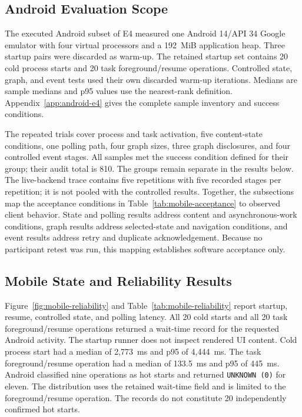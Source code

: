 \subsection{Android Evaluation Scope}
\label{sec:e4-android}

The executed Android subset of E4 measured one Android 14/API 34 Google emulator with four virtual processors and a 192~MiB application heap.
Three startup pairs were discarded as warm-up.
The retained startup set contains 20 cold process starts and 20 task foreground/resume operations.
Controlled state, graph, and event tests used their own discarded warm-up iterations.
Medians are sample medians and p95 values use the nearest-rank definition.
Appendix~\ref{app:android-e4} gives the complete sample inventory and success conditions.

The repeated trials cover process and task activation, five content-state conditions, one polling path, four graph sizes, three graph disclosures, and four controlled event stages.
All samples met the success condition defined for their group; their audit total is 810.
The groups remain separate in the results below.
The live-backend trace contains five repetitions with five recorded stages per repetition; it is not pooled with the controlled results.
Together, the subsections map the acceptance conditions in Table~\ref{tab:mobile-acceptance} to observed client behavior.
State and polling results address content and asynchronous-work conditions, graph results address selected-state and navigation conditions, and event results address retry and duplicate acknowledgement.
Because no participant retest was run, this mapping establishes software acceptance only.

\subsection{Mobile State and Reliability Results}

Figure~\ref{fig:mobile-reliability} and Table~\ref{tab:mobile-reliability} report startup, resume, controlled state, and polling latency.
All 20 cold starts and all 20 task foreground/resume operations returned a wait-time record for the requested Android activity.
The startup runner does not inspect rendered UI content.
Cold process start had a median of 2,773~ms and p95 of 4,444~ms.
The task foreground/resume operation had a median of 133.5~ms and p95 of 445~ms.
Android classified nine operations as hot starts and returned \texttt{UNKNOWN (0)} for eleven.
The distribution uses the retained wait-time field and is limited to the foreground/resume operation.
The records do not constitute 20 independently confirmed hot starts.

